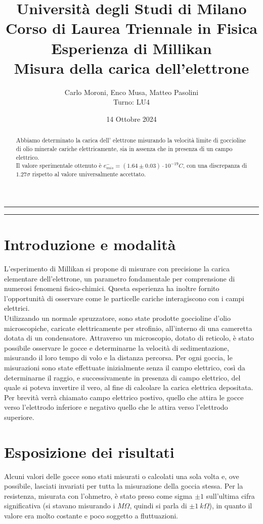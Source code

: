 \documentclass{article}
\title{{\large Università degli Studi di Milano}\\{\large Corso di Laurea Triennale in Fisica}\\{\LARGE Esperienza di Millikan}\\{\normalsize Misura della carica dell'elettrone}}
\author{Carlo Moroni, Enco Musa, Matteo Pasolini\\{Turno: LU4}}
\date{14 Ottobre 2024}
\begin{document}
	
\maketitle
\hrule
\begin{abstract}
	\noindent Abbiamo determinato la carica dell' elettrone misurando la velocità limite di goccioline di olio minerale cariche elettricamente, sia in assenza che in presenza di un campo elettrico.\\
	Il valore sperimentale ottenuto è $e^-_{mis}=(1.64 \pm 0.03)\cdot10^{-19} C$, con una discrepanza di $1.27\sigma$ rispetto al valore universalmente accettato.\\ 
\end{abstract}
\hrule

\section{Introduzione e modalità}

L'esperimento di Millikan si propone di misurare con precisione la carica elementare dell'elettrone, un parametro fondamentale per comprensione di numerosi fenomeni fisico-chimici. Questa esperienza ha inoltre fornito l'opportunità di osservare come le particelle cariche interagiscono con i campi elettrici.\\

Utilizzando un normale spruzzatore, sono state prodotte goccioline d'olio microscopiche, caricate elettricamente per strofinio, all'interno di una cameretta dotata di un condensatore. Attraverso un microscopio, dotato di reticolo, è stato possibile osservare le gocce e determinarne la velocità di sedimentazione, misurando il loro tempo di volo e la distanza percorsa. Per ogni goccia, le misurazioni sono state effettuate inizialmente senza il campo elettrico, così da determinarne il raggio, e successivamente in presenza di campo elettrico, del quale si poteva invertire il vero, al fine di calcolare la carica elettrica depositata.\\

Per brevità verrà chiamato campo elettrico postivo, quello che attira le gocce verso l'elettrodo inferiore e negativo quello che le attira verso l'elettrodo superiore.

\section{Esposizione dei risultati}

Alcuni valori delle gocce sono stati misurati o calcolati una sola volta e, ove possibile, lasciati invariati per tutta la misurazione della goccia stessa. Per la resistenza, misurata con l'ohmetro, è stato preso come sigma $\pm1$ sull'ultima cifra significativa (si stavano misurando i $M\Omega$, quindi si parla di $\pm1\ k\Omega$), in quanto il valore era molto costante e poco soggetto a fluttuazioni.\\
\end{document}
